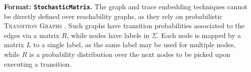 \textbf{Format: \texttt{StochasticMatrix}.} %
The graph and trace embedding techniques %
cannot be directly defined over reachability graphs, as they %
rely on probabilistic \textsc{Transition Graphs} \cite{GartnerFW03}. Such graphs have transition probabilities associated to the edges via a matrix $R$, while nodes have labels in $\Sigma$. Each node is mapped by a matrix $L$ to a single label, as the same label may be used for multiple nodes, while $R$ is a probability distribution over the next nodes to be picked upon executing a transition.
